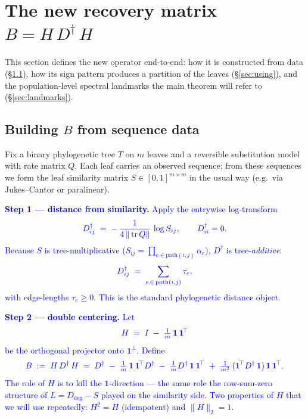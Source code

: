 \documentclass[11pt]{article}
\newcommand{\new}[1]{\textcolor{blue}{#1}}
\newcommand{\newmath}[1]{{\color{blue} #1}}
\theoremstyle{remark}
\newcommand{\1}{\mathbf{1}}
\newcommand{\Tr}{\operatorname{tr}}
\newcommand{\Ddeg}{D_{\mathrm{deg}}}
\newcommand{\Ddist}{D^{\dagger}}      %
\newcommand{\Bop}{B}
\newcommand{\Hop}{H}                  %
\begin{document}
\newpage
\section{The new recovery matrix \texorpdfstring{$\Bop = \Hop\,\Ddist\,\Hop$}{B = H D H}}
\label{sec:operator}

This section defines the new operator end-to-end: how it is constructed
from data (\S\ref{sec:building}), how its sign pattern produces a
partition of the leaves (\S\ref{sec:using}), and the population-level
spectral landmarks the main theorem will refer to
(\S\ref{sec:landmarks}).

\subsection{Building \texorpdfstring{$\Bop$}{B} from sequence data}
\label{sec:building}

Fix a binary phylogenetic tree $T$ on $m$ leaves and a reversible
substitution model with rate matrix $Q$. Each leaf carries an observed
sequence; from these sequences we form the leaf similarity matrix $S \in
[0,1]^{m\times m}$ in the usual way (e.g.\ via Jukes--Cantor or paralinear).

\new{\textbf{Step 1 --- distance from similarity.}
Apply the entrywise log-transform}
\begin{equation}
\newmath{
  \Ddist_{ij} \;=\; -\,\frac{1}{4\,\|\Tr Q\|}\,\log S_{ij},
  \qquad
  \Ddist_{ii} = 0.
}\label{eq:M1-Ddist}
\end{equation}
\new{Because $S$ is tree-multiplicative ($S_{ij} = \prod_{e \in
\mathrm{path}(i,j)} \alpha_e$), $\Ddist$ is tree-\emph{additive}:}
\begin{equation}
\newmath{
  \Ddist_{ij} \;=\; \sum_{e \,\in\, \mathrm{path}(i,j)} \tau_e,
}
\end{equation}
\new{with edge-lengths $\tau_e \ge 0$. This is the standard phylogenetic
distance object.}

\new{\textbf{Step 2 --- double centering.}
Let}
\begin{equation}
\newmath{
  \Hop \;=\; I \;-\; \tfrac{1}{m}\,\1\,\1^{\!\top}
}
\end{equation}
\new{be the orthogonal projector onto $\1^{\perp}$. Define}
\begin{equation}
\newmath{
  \Bop \;:=\; \Hop\,\Ddist\,\Hop
  \;=\; \Ddist \;-\; \tfrac{1}{m}\,\1\,\1^{\!\top}\Ddist \;-\; \tfrac{1}{m}\Ddist\,\1\,\1^{\!\top}
       \;+\; \tfrac{1}{m^{2}}\,(\1^{\!\top}\Ddist\,\1)\,\1\,\1^{\!\top}.
}
\end{equation}
\new{The role of $\Hop$ is to kill the $\1$-direction --- the same role
the row-sum-zero structure of $L = \Ddeg - S$ played on the similarity
side. Two properties of $\Hop$ that we will use repeatedly:
$\Hop^{2} = \Hop$ (idempotent) and $\|\Hop\|_{2} = 1$.}
\end{document}

